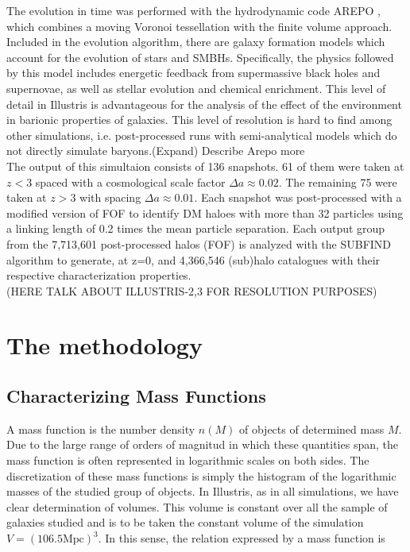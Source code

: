 \documentclass[a4paper,fleqn,usenatbib]{mnras}
\begin{document}
The evolution in time was performed with the hydrodynamic code AREPO
\cite{arepo}, which combines a moving Voronoi tessellation with the
finite volume approach. Included in the evolution algorithm, there are
galaxy formation models which account for the evolution of stars and
SMBHs. Specifically, the physics followed by this model includes
energetic feedback from supermassive black holes and supernovae, as
well as stellar evolution and chemical enrichment. This level of
detail in Illustris is advantageous for the analysis of the effect of
the environment in barionic properties of galaxies. This level of resolution is hard to find
among other simulations, i.e. post-processed runs with semi-analytical
models which do not directly simulate baryons.(Expand) Describe Arepo more\\ 

The output of this simultaion consists of 136 snapshots. 61 of
them were taken at $z < 3$ spaced with a cosmological scale factor
$\Delta a \approx 0.02$. The remaining 75 were taken at $z > 3$
with spacing $\Delta a \approx 0.01$. Each snapshot was post-processed
with a modified version of FOF \cite{FOF} to identify DM haloes with
more than 32 particles using a linking length of 0.2 times the mean
particle separation. Each output group from the 7,713,601 post-processed halos (FOF) is analyzed with the SUBFIND
algorithm \cite{subfind} to generate, at z=0,
and 4,366,546 (sub)halo catalogues with their respective
characterization properties. \\ 

(HERE TALK ABOUT ILLUSTRIS-2,3 FOR RESOLUTION PURPOSES)

\section{The methodology}

\subsection{ Characterizing Mass Functions}
A mass function is the number density $n(M)$ of objects of determined mass $M$.
Due to the large range of orders of magnitud in which these quantities span, the mass function is often represented in logarithmic scales on both sides. 
The discretization of these mass functions is simply the histogram of the logarithmic masses of the studied group of objects. 
In Illustris, as in all simulations, we have clear determination of volumes. This volume is constant over all the sample of galaxies studied and is to be taken the constant volume of the simulation $V = \left(106.5\text{Mpc}\right)^3$. 
In this sense, the relation expressed by a mass function is 
\end{document}
